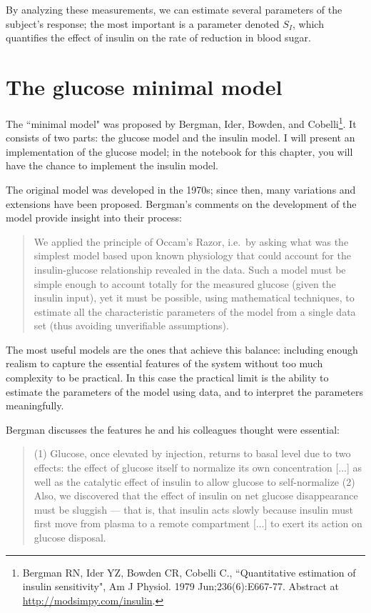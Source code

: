 \documentclass[12pt]{book}
\theoremstyle{exercise}
\begin{document}
By analyzing these measurements, we can estimate several parameters of the subject's response; the most important is a parameter denoted $S_I$, which quantifies the effect of insulin on the rate of reduction in blood sugar.


\section{The glucose minimal model}

The ``minimal model" was proposed by Bergman, Ider, Bowden, and Cobelli\footnote{Bergman RN, Ider YZ, Bowden CR, Cobelli C., ``Quantitative estimation of insulin sensitivity", Am J Physiol. 1979 Jun;236(6):E667-77.  Abstract at \url{http://modsimpy.com/insulin}.}.
It consists of two parts: the glucose model and the insulin model.  I will present an implementation of the glucose model; in the notebook for this chapter, you will have the chance to implement the insulin model.

The original model was developed in the 1970s; since then, many variations and extensions have been proposed.  Bergman's comments on the development of the model provide insight into their process:

\begin{quote}
We applied the principle of Occam's Razor, i.e.~by asking
what was the simplest model based upon known physiology
that could account for the insulin-glucose relationship
revealed in the data. Such a model must be simple
enough to account totally for the measured glucose (given
the insulin input), yet it must be possible, using mathematical
techniques, to estimate all the characteristic parameters
of the model from a single data set (thus avoiding
unverifiable assumptions).
\end{quote}

The most useful models are the ones that achieve this balance: including enough realism to capture the essential features of the system without too much complexity to be practical.  In this case the practical limit is the ability to estimate the parameters of the model using data, and to interpret the parameters meaningfully.

Bergman discusses the features he and his colleagues thought were essential:

\begin{quote}
(1) Glucose, once elevated by injection, returns to basal level due to
two effects: the effect of glucose itself to normalize its own
concentration [...] as well as the catalytic effect of insulin to allow
glucose to self-normalize (2) Also, we discovered
that the effect of insulin on net glucose disappearance
must be sluggish --- that is, that insulin acts slowly because
insulin must first move from plasma to a remote compartment [...] to exert its action on glucose disposal.
\end{quote}
\end{document}
